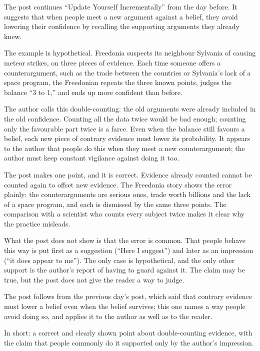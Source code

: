 \begin{afterword}
\summaryhead

The post continues ``Update Yourself Incrementally'' from the day before. It suggests that when people meet a new argument against a belief, they avoid lowering their confidence by recalling the supporting arguments they already knew.

The example is hypothetical. Freedonia suspects its neighbour Sylvania of causing meteor strikes, on three pieces of evidence. Each time someone offers a counterargument, such as the trade between the countries or Sylvania's lack of a space program, the Freedonian repeats the three known points, judges the balance ``3 to 1,'' and ends up more confident than before.

The author calls this double-counting: the old arguments were already included in the old confidence. Counting all the data twice would be bad enough; counting only the favourable part twice is a farce. Even when the balance still favours a belief, each new piece of contrary evidence must lower its probability. It appears to the author that people do this when they meet a new counterargument; the author must keep constant vigilance against doing it too.

\responsehead

The post makes one point, and it is correct. Evidence already counted cannot be counted again to offset new evidence. The Freedonia story shows the error plainly: the counterarguments are serious ones, trade worth billions and the lack of a space program, and each is dismissed by the same three points. The comparison with a scientist who counts every subject twice makes it clear why the practice misleads.

What the post does not show is that the error is common. That people behave this way is put first as a suggestion (``Here I suggest'') and later as an impression (``it does appear to me''). The only case is hypothetical, and the only other support is the author's report of having to guard against it. The claim may be true, but the post does not give the reader a way to judge.

The post follows from the previous day's post, which said that contrary evidence must lower a belief even when the belief survives; this one names a way people avoid doing so, and applies it to the author as well as to the reader.

In short: a correct and clearly shown point about double-counting evidence, with the claim that people commonly do it supported only by the author's impression.
\end{afterword}
